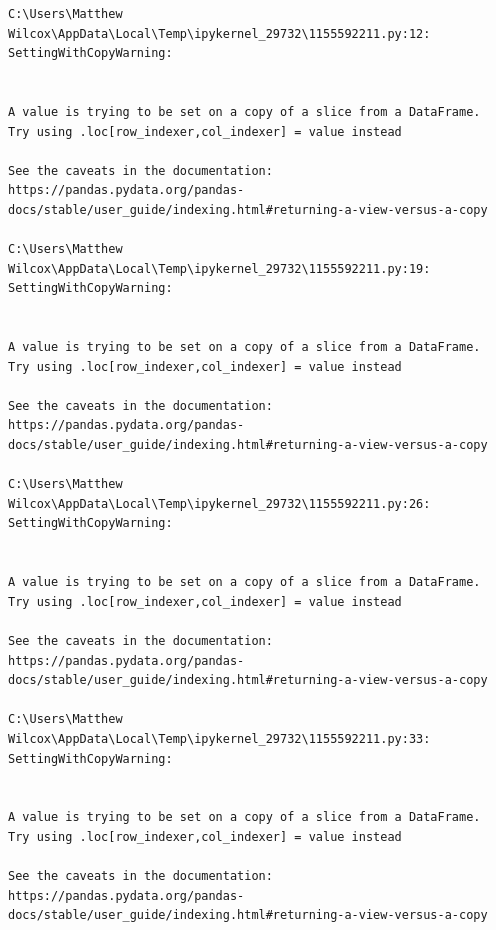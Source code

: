 \documentclass[
  letterpaper,
  DIV=11,
  numbers=noendperiod]{scrartcl}
\begin{document}
\begin{verbatim}
C:\Users\Matthew Wilcox\AppData\Local\Temp\ipykernel_29732\1155592211.py:12: SettingWithCopyWarning:


A value is trying to be set on a copy of a slice from a DataFrame.
Try using .loc[row_indexer,col_indexer] = value instead

See the caveats in the documentation: https://pandas.pydata.org/pandas-docs/stable/user_guide/indexing.html#returning-a-view-versus-a-copy

C:\Users\Matthew Wilcox\AppData\Local\Temp\ipykernel_29732\1155592211.py:19: SettingWithCopyWarning:


A value is trying to be set on a copy of a slice from a DataFrame.
Try using .loc[row_indexer,col_indexer] = value instead

See the caveats in the documentation: https://pandas.pydata.org/pandas-docs/stable/user_guide/indexing.html#returning-a-view-versus-a-copy

C:\Users\Matthew Wilcox\AppData\Local\Temp\ipykernel_29732\1155592211.py:26: SettingWithCopyWarning:


A value is trying to be set on a copy of a slice from a DataFrame.
Try using .loc[row_indexer,col_indexer] = value instead

See the caveats in the documentation: https://pandas.pydata.org/pandas-docs/stable/user_guide/indexing.html#returning-a-view-versus-a-copy

C:\Users\Matthew Wilcox\AppData\Local\Temp\ipykernel_29732\1155592211.py:33: SettingWithCopyWarning:


A value is trying to be set on a copy of a slice from a DataFrame.
Try using .loc[row_indexer,col_indexer] = value instead

See the caveats in the documentation: https://pandas.pydata.org/pandas-docs/stable/user_guide/indexing.html#returning-a-view-versus-a-copy
\end{verbatim}
\end{document}
